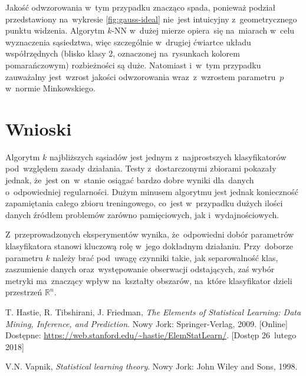 \documentclass[11pt,a4paper]{article}
\begin{document}
Jakość odwzorowania w~tym przypadku znacząco spada, ponieważ podział przedstawiony na~wykresie \ref{fig:gauss-ideal} nie~jest intuicyjny z~geometrycznego punktu widzenia.
Algorytm $k$-NN w~dużej mierze opiera~się na~miarach w~celu wyznaczenia sąsiedztwa, więc szczególnie w~drugiej ćwiartce układu współrzędnych (blisko klasy 2, oznaczonej na~rysunkach kolorem pomarańczowym) rozbieżności są duże.
Natomiast i~w~tym przypadku zauważalny jest~wzrost jakości odwzorowania wraz~z~wzrostem parametru~$p$ w~normie Minkowskiego.

\section{Wnioski}

Algorytm $k$ najbliższych sąsiadów jest jednym z~najprostszych klasyfikatorów pod~względem zasady działania.
Testy z~dostarczonymi zbiorami pokazały jednak, że~jest on~w~stanie osiągać bardzo dobre wyniki dla~danych o~odpowiedniej regularności.
Dużym minusem algorytmu jest jednak konieczność zapamiętania całego zbioru treningowego, co~jest w~przypadku dużych ilości danych źródłem problemów zarówno pamięciowych, jak i~wydajnościowych.

Z~przeprowadzonych eksperymentów wynika, że~odpowiedni dobór parametrów klasyfikatora stanowi kluczową rolę w~jego dokładnym działaniu.
Przy~doborze parametru $k$ należy brać pod~uwagę czynniki takie, jak separowalność klas, zaszumienie danych oraz~występowanie obserwacji odstających, zaś wybór metryki ma~znaczący wpływ na~kształty obszarów, na~które klasyfikator dzieli przestrzeń $\mathbb{R}^n$.

\begin{thebibliography}{9}

        T. Hastie,
        R. Tibshirani,
        J. Friedman,
        \emph{The Elements of Statistical Learning: Data Mining, Inference, and Prediction}.
        Nowy Jork: Springer-Verlag,
        2009.
        [Online] \\
        Dostępne: \url{https://web.stanford.edu/~hastie/ElemStatLearn/}.
        [Dostęp 26~lutego 2018]

        V.N. Vapnik,
        \emph{Statistical learning theory}.
        Nowy Jork: John Wiley and Sons,
        1998.

\end{thebibliography}
\end{document}
